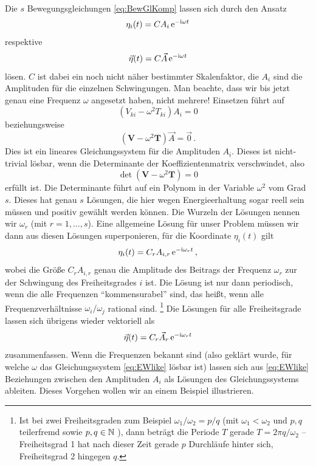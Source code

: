 \documentclass[paper=a4, fontsize=11.0pt, abstractoff, DIV12]{scrartcl}
\begin{document}
Die $s$ Bewegungsgleichungen \eqref{eq:BewGlKomp} lassen sich durch den Ansatz
\begin{equation}
\eta_i(t) = C A_i \,{\mathrm{e}}^{-\mathrm{i} \omega t}
\end{equation}
respektive
\begin{equation}
\vec{\eta}(t) = C \vec{A} \eto{-\ii \omega t}
\end{equation}
lösen. $C$ ist dabei ein noch nicht näher bestimmter Skalenfaktor, die $A_i$
sind die Amplituden für die einzelnen Schwingungen. Man beachte, dass wir
bis jetzt genau eine Frequenz $\omega$ angesetzt haben, nicht mehrere!
Einsetzen führt auf
\begin{equation}
\left(V_{ki} - \omega^2 T_{ki} \right)A_i = 0
\end{equation}
beziehungsweise
\begin{equation}
\left(\mathbf{V} - \omega^2\mathbf{T}\right)\vec{A} = \vec 0\, .
\label{eq:EWlike}
\end{equation}
Dies ist ein lineares Gleichungssystem für die Amplituden $A_i$. Dieses ist
nicht-trivial lösbar, wenn die Determinante der Koeffizientenmatrix
verschwindet, also
\begin{equation}
\det \left(\mathbf{V} - \omega^2\mathbf{T} \right) = 0
\label{eq:Det}
\end{equation}
erfüllt ist. Die Determinante führt auf ein Polynom in der Variable
$\omega^2$ vom Grad $s$. Dieses hat genau $s$ Lösungen, die hier wegen
Energieerhaltung sogar reell sein müssen und positiv gewählt werden können.
Die Wurzeln der Lösungen nennen wir $\omega_r$ (mit $r=1,\dots,s$). Eine
allgemeine Lösung für unser Problem müssen wir dann aus diesen Lösungen
superponieren, für die Koordinate $\eta_i(t)$ gilt
\begin{equation}
\eta_i(t) = C_r A_{i,r} \,{\mathrm{e}}^{-\mathrm{i} \omega_r t}\, ,
\label{eq:SchwingR}
\end{equation}
wobei die Größe $C_r A_{i,r}$ genau die Amplitude des Beitrags der Frequenz
$\omega_r$ zur der Schwingung des Freiheitsgrades $i$ ist. Die Lösung ist
nur dann periodisch, wenn die alle Frequenzen ``kommensurabel'' sind, das
heißt, wenn alle Frequenzverhältnisse $\omega_i/\omega_j$ rational
sind. \footnote{Ist bei zwei Freiheitsgraden zum Beispiel $\omega_1/\omega_2 = p/q$
(mit $\omega_1 < \omega_2$ und $p,q$ teilerfremd sowie $p,q \in \mathbb{N}$
), dann beträgt die Periode $T$ gerade $T=2\pi q/\omega_2$ -- Freiheitsgrad
1 hat nach dieser Zeit gerade $p$ Durchläufe hinter sich, Freiheitsgrad 2
hingegen $q$.} Die Lösungen für alle Freiheitsgrade lassen sich übrigens
wieder vektoriell als
\begin{equation}
\vec\eta(t) = C_r \vec A_r \eto{-\ii\omega_r t}
\label{eq:BewLsg}
\end{equation}
zusammenfassen. Wenn die Frequenzen bekannt sind (also geklärt wurde, für
welche $\omega$ das Gleichungssystem \eqref{eq:EWlike} lösbar ist) lassen sich
aus \eqref{eq:EWlike} Beziehungen zwischen den Amplituden $A_i$ als Lösungen
des Gleichungssystems ableiten. Dieses Vorgehen wollen wir an einem Beispiel
illustrieren.
\end{document}
